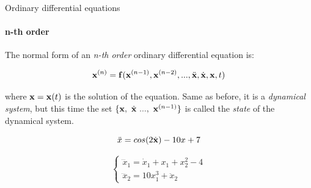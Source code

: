 \documentclass{beamer}
\begin{document}
\begin{frame}{Ordinary differential equations}
\framesubtitle{n-th order}
\begin{flushleft}

The normal form of an \emph{n-th order} ordinary differential equation is:

\begin{equation}
    \mathbf{x}^{(n)} = \mathbf{f} (\mathbf{x}^{(n-1)}, \mathbf{x}^{(n-2)}, ..., \ddot{\mathbf{x}}, \dot{\mathbf{x}}, \mathbf{x}, t)
\end{equation}

where $\mathbf{x} = \mathbf{x}(t)$ is the solution of the equation. Same as before, it is a \emph{dynamical system}, but this time the set $\{ \mathbf{x}, \ \dot{\mathbf{x}} \ ..., \ \mathbf{x}^{(n-1)} \}$ is called the \emph{state} of the dynamical system.

\begin{example}
\begin{equation}
    \ddot{x} = cos(2\dot{\mathbf{x}}) - 10 x + 7 
\end{equation}
\end{example}


\begin{example}
\begin{equation}
\begin{cases}
    \dddot{x}_1 = \dot{x}_1 + x_1 + x_2^2 - 4 \\
    \dddot{x}_2 = 10 x_1^3 + \ddot{x}_2
\end{cases}
\end{equation}
\end{example}

\end{flushleft}
\end{frame}
\end{document}
